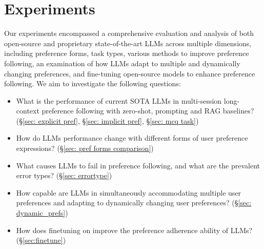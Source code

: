 \vspace{-1em}
\section{Experiments}

Our experiments encompassed a comprehensive evaluation and analysis of both open-source and proprietary state-of-the-art LLMs across multiple dimensions, including preference forms, task types, various methods to improve preference following, an examination of how LLMs adapt to multiple and dynamically changing preferences, and fine-tuning open-source models to enhance preference following. We aim to investigate the following questions:
\vspace{-2mm}
\begin{itemize} [leftmargin=.2in]
\item What is the performance of current SOTA LLMs in multi-session long-context preference following with zero-shot, prompting and RAG baselines? (\S\ref{sec: explicit pref}, \S\ref{sec: implicit pref}, \S\ref{sec: mcq task})

\item How do LLMs performance change with different forms of user preference expressions? (\S\ref{sec: pref forms comparison})

\item What causes LLMs to fail in preference following, and what are the prevalent error types? (\S\ref{sec: errortype})

\item How capable are LLMs in simultaneously accommodating multiple user preferences and adapting to dynamically changing user preferences? (\S\ref{sec: dynamic_prefs})

\item How does finetuning on \ours{} improve the preference adherence ability of LLMs? (\S\ref{sec:finetune})

\end{itemize}

